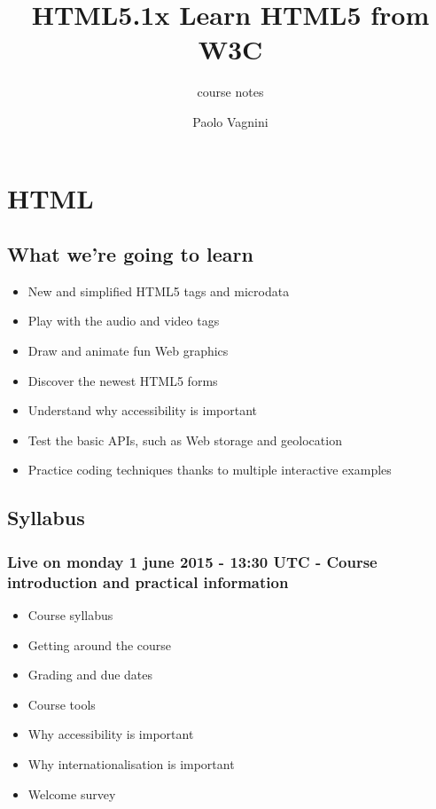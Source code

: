 \documentclass[a4paper,11pt]{book}
\title{HTML5.1x Learn HTML5 from W3C}
\subtitle{course notes}
\author{Paolo Vagnini}
\begin{document}
\maketitle
\tableofcontents

\part{HTML}

\chapter{What we're going to learn}
\begin{itemize}
    \item New and simplified HTML5 tags and microdata
    \item Play with the audio and video tags
    \item Draw and animate fun Web graphics
    \item Discover the newest HTML5 forms
    \item Understand why accessibility is important
    \item Test the basic APIs, such as Web storage and geolocation
    \item Practice coding techniques thanks to multiple interactive examples
\end{itemize}

\chapter{Syllabus}

\section{Live on monday 1 june 2015 - 13:30 UTC - Course introduction and practical information}
\begin{itemize}
    \item Course syllabus
    \item Getting around the course
    \item Grading and due dates
    \item Course tools
    \item Why accessibility is important
    \item Why internationalisation is important
    \item Welcome survey
\end{itemize}
\end{document}
